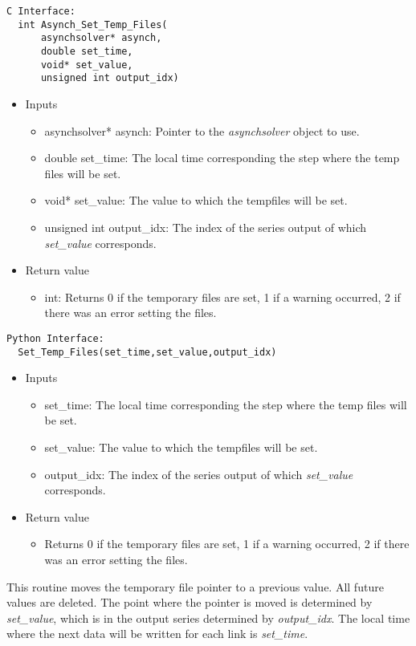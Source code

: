 \documentclass[12pt]{article}
\begin{document}
\begin{lstlisting}[style=CStyle]
  C Interface:
  int Asynch_Set_Temp_Files(
      asynchsolver* asynch,
      double set_time,
      void* set_value,
      unsigned int output_idx)
\end{lstlisting}
\begin{itemize}
 \item Inputs
  \begin{itemize}
   \item asynchsolver* asynch: Pointer to the \emph{asynchsolver} object to use.
   \item double set\_time: The local time corresponding the step where the temp files will be set.
   \item void* set\_value: The value to which the tempfiles will be set.
   \item unsigned int output\_idx: The index of the series output of which \emph{set\_value} corresponds.
  \end{itemize}
 \item Return value
  \begin{itemize}
   \item int: Returns 0 if the temporary files are set, 1 if a warning occurred, 2 if there was an error setting the files.
  \end{itemize}
\end{itemize}
\begin{lstlisting}[style=PythonStyle]
  Python Interface:
  Set_Temp_Files(set_time,set_value,output_idx)
\end{lstlisting}
\begin{itemize}
 \item Inputs
  \begin{itemize}
   \item set\_time: The local time corresponding the step where the temp files will be set.
   \item set\_value: The value to which the tempfiles will be set.
   \item output\_idx: The index of the series output of which \emph{set\_value} corresponds.
  \end{itemize}
 \item Return value
  \begin{itemize}
   \item Returns 0 if the temporary files are set, 1 if a warning occurred, 2 if there was an error setting the files.
  \end{itemize}
\end{itemize}
This routine moves the temporary file pointer to a previous value. All future values are deleted. The point where the pointer is moved is determined by \emph{set\_value}, which is in the output series determined by \emph{output\_idx}. The local time where the next data will be written for each link is \emph{set\_time}.
\end{document}
